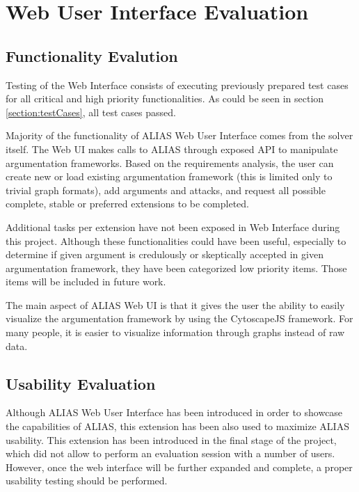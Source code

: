 \section{Web User Interface Evaluation}


\subsection{Functionality Evalution}
Testing of the Web Interface consists of executing previously prepared test cases for all critical and high priority functionalities. As could be seen in section \ref{section:testCases}, all test cases passed.

Majority of the functionality of ALIAS Web User Interface comes from the solver itself. The Web UI makes calls to ALIAS through exposed API to manipulate argumentation frameworks. Based on the requirements analysis, the user can create new or load existing argumentation framework (this is limited only to trivial graph formats), add arguments and attacks, and request all possible complete, stable or preferred extensions to be completed. 

Additional tasks per extension have not been exposed in Web Interface during this project. Although these functionalities could have been useful, especially to determine if given argument is credulously or skeptically accepted in given argumentation framework, they have been categorized low priority items. Those items will be included in future work.

The main aspect of ALIAS Web UI is that it gives the user the ability to easily visualize the argumentation framework by using the CytoscapeJS framework. For many people, it is easier to visualize information through graphs instead of raw data. 

\subsection{Usability Evaluation}
Although ALIAS Web User Interface has been introduced in order to showcase the capabilities of ALIAS, this extension has been also used to maximize ALIAS usability. This extension has been introduced in the final stage of the project, which did not allow to perform an evaluation session with a number of users. However, once the web interface will be further expanded and complete, a proper usability testing should be performed.
